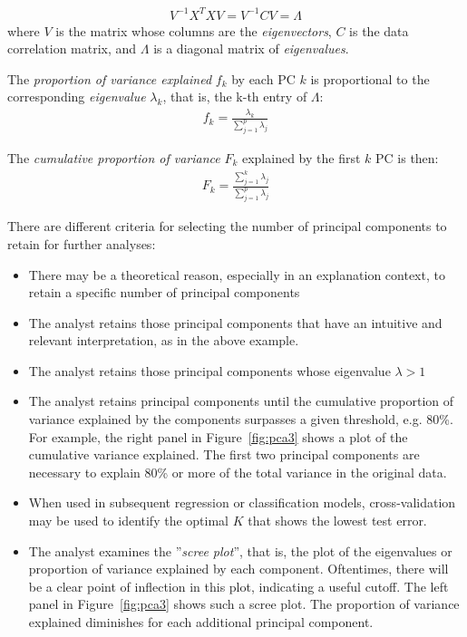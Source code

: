 \begin{align*}
 V^{-1} X^T X V = V^{-1}CV = \Lambda
\end{align*}
\noindent where $V$ is the matrix whose columns are the \emph{eigenvectors}, $C$ is the data correlation matrix, and $\Lambda$ is a diagonal matrix of \emph{eigenvalues}.

\noindent The \emph{proportion of variance explained} $f_k$ by each PC $k$ is proportional to the corresponding \emph{eigenvalue} $\lambda_k$, that is, the k-th entry of $\Lambda$:
\begin{align*}
f_k = \frac{\lambda_k}{\sum_{j=1}^p \lambda_{j}} 
\end{align*}

\noindent The \emph{cumulative proportion of variance} $F_k$ explained by the first $k$ PC is then:
\begin{align*}
F_k = \frac{\sum_{j=1}^k \lambda_j}{\sum_{j=1}^p \lambda_{j}}
\end{align*}

There are different criteria for selecting the number of principal components to retain for further analyses:

\begin{itemize}
  \item There may be a theoretical reason, especially in an explanation context, to retain a specific number of principal components
  \item The analyst retains those principal components that have an intuitive and relevant interpretation, as in the above example. 
  \item The analyst retains those principal components whose eigenvalue $\lambda > 1$
  \item The analyst retains principal components until the cumulative proportion of variance explained by the components surpasses a given threshold, e.g. 80\%. For example, the right panel in Figure~\ref{fig:pca3} shows a plot of the cumulative variance explained. The first two principal components are necessary to explain 80\% or more of the total variance in the original data.
  \item When used in subsequent regression or classification models, cross-validation may be used to identify the optimal $K$ that shows the lowest test error.
  \item The analyst examines the ''\emph{scree plot}'', that is, the plot of the eigenvalues or proportion of variance explained by each component. Oftentimes, there will be a clear point of inflection in this plot, indicating a useful cutoff. The left panel in Figure~\ref{fig:pca3} shows such a scree plot. The proportion of variance explained diminishes for each additional principal component.
\end{itemize}

